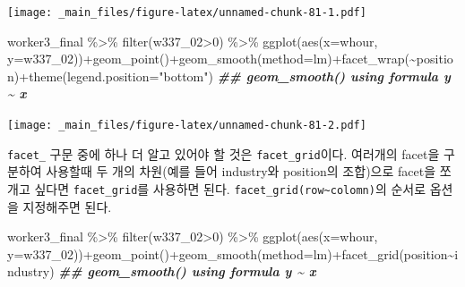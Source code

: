 \documentclass[
]{book}
\newenvironment{Shaded}{\begin{snugshade}}{\end{snugshade}}
\newcommand{\AttributeTok}[1]{\textcolor[rgb]{0.77,0.63,0.00}{#1}}
\newcommand{\DecValTok}[1]{\textcolor[rgb]{0.00,0.00,0.81}{#1}}
\newcommand{\DocumentationTok}[1]{\textcolor[rgb]{0.56,0.35,0.01}{\textbf{\textit{#1}}}}
\newcommand{\FunctionTok}[1]{\textcolor[rgb]{0.00,0.00,0.00}{#1}}
\newcommand{\NormalTok}[1]{#1}
\newcommand{\SpecialCharTok}[1]{\textcolor[rgb]{0.00,0.00,0.00}{#1}}
\newcommand{\StringTok}[1]{\textcolor[rgb]{0.31,0.60,0.02}{#1}}
\theoremstyle{definition}
\theoremstyle{definition}
\theoremstyle{definition}
\theoremstyle{definition}
\theoremstyle{remark}
\begin{document}
\texttt{[image: \_main\_files/figure-latex/unnamed-chunk-81-1.pdf]}

\begin{Shaded}
\begin{Highlighting}[]

\NormalTok{worker3\_final }\SpecialCharTok{\%\textgreater{}\%} 
  \FunctionTok{filter}\NormalTok{(w337\_02}\SpecialCharTok{\textgreater{}}\DecValTok{0}\NormalTok{) }\SpecialCharTok{\%\textgreater{}\%} 
  \FunctionTok{ggplot}\NormalTok{(}\FunctionTok{aes}\NormalTok{(}\AttributeTok{x=}\NormalTok{whour, }\AttributeTok{y=}\NormalTok{w337\_02))}\SpecialCharTok{+}\FunctionTok{geom\_point}\NormalTok{()}\SpecialCharTok{+}\FunctionTok{geom\_smooth}\NormalTok{(}\AttributeTok{method=}\StringTok{\textquotesingle{}lm\textquotesingle{}}\NormalTok{)}\SpecialCharTok{+}\FunctionTok{facet\_wrap}\NormalTok{(}\SpecialCharTok{\textasciitilde{}}\NormalTok{position)}\SpecialCharTok{+}\FunctionTok{theme}\NormalTok{(}\AttributeTok{legend.position=}\StringTok{"bottom"}\NormalTok{)}
\DocumentationTok{\#\# \textasciigrave{}geom\_smooth()\textasciigrave{} using formula \textquotesingle{}y \textasciitilde{} x\textquotesingle{}}
\end{Highlighting}
\end{Shaded}

\texttt{[image: \_main\_files/figure-latex/unnamed-chunk-81-2.pdf]}

\texttt{facet\_} 구문 중에 하나 더 알고 있어야 할 것은 \texttt{facet\_grid}이다. 여러개의 facet을 구분하여 사용할때 두 개의 차원(예를 들어 industry와 position의 조합)으로 facet을 쪼개고 싶다면 \texttt{facet\_grid}를 사용하면 된다. \texttt{facet\_grid(row\textasciitilde{}colomn)}의 순서로 옵션을 지정해주면 된다.

\begin{Shaded}
\begin{Highlighting}[]
\NormalTok{worker3\_final }\SpecialCharTok{\%\textgreater{}\%} 
  \FunctionTok{filter}\NormalTok{(w337\_02}\SpecialCharTok{\textgreater{}}\DecValTok{0}\NormalTok{) }\SpecialCharTok{\%\textgreater{}\%} 
  \FunctionTok{ggplot}\NormalTok{(}\FunctionTok{aes}\NormalTok{(}\AttributeTok{x=}\NormalTok{whour, }\AttributeTok{y=}\NormalTok{w337\_02))}\SpecialCharTok{+}\FunctionTok{geom\_point}\NormalTok{()}\SpecialCharTok{+}\FunctionTok{geom\_smooth}\NormalTok{(}\AttributeTok{method=}\StringTok{\textquotesingle{}lm\textquotesingle{}}\NormalTok{)}\SpecialCharTok{+}\FunctionTok{facet\_grid}\NormalTok{(position}\SpecialCharTok{\textasciitilde{}}\NormalTok{industry)}
\DocumentationTok{\#\# \textasciigrave{}geom\_smooth()\textasciigrave{} using formula \textquotesingle{}y \textasciitilde{} x\textquotesingle{}}
\end{Highlighting}
\end{Shaded}
\end{document}
